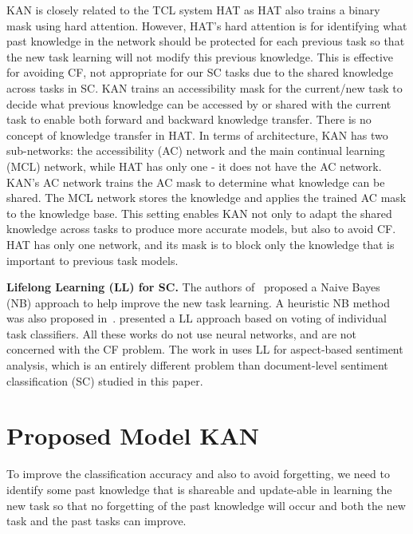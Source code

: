 \documentclass[runningheads]{llncs}
\begin{document}
{\color{black}KAN is closely related to the TCL system HAT \cite{DBLP:conf/icml/SerraSMK18} as HAT also trains a binary mask using hard attention. However, HAT's hard attention is for identifying what past knowledge in the network should be protected for each previous task so that the new task learning will not modify this previous knowledge. This is effective for avoiding CF, not appropriate for our SC tasks due to the shared knowledge across tasks in SC. KAN trains an accessibility mask for the current/new task to decide what previous knowledge can be accessed by or shared with the current task to enable both forward and backward knowledge transfer. There is no concept of knowledge transfer in HAT. In terms of architecture, KAN has two sub-networks: the accessibility (AC) network and the main continual learning (MCL) network, while HAT has only one - it does not have the AC network. KAN's AC network trains the AC mask to determine what knowledge can be shared. The MCL network stores the knowledge and applies the trained AC mask to the knowledge base. This setting enables KAN not only to adapt the shared  knowledge across tasks to produce more accurate models, but also to avoid CF. HAT has only one network, and its mask is to block only the knowledge that is important to previous task models. } 



\vspace{2mm}
\noindent
\textbf{Lifelong Learning (LL) for SC.} The authors of~\cite{DBLP:conf/acl/ChenM015,hao2019forward} proposed a Naive Bayes (NB) approach to help improve the new task learning. A heuristic NB method was also proposed in~\cite{hao2019forward}.  \cite{xia2017distantly} presented {\color{black}a} LL approach based on voting of individual task classifiers. All these works do not use neural networks, and are not concerned with the CF problem. The work in \cite{ShuXuLiu2017,shuai2018lifelong} uses LL for aspect-based sentiment analysis, which is an entirely different problem than document-level sentiment classification (SC) studied in this paper. 




\section{Proposed Model KAN}
\label{sec:model}





To improve the classification accuracy and also to avoid forgetting, we need to identify some past knowledge that is shareable and update-able in learning the new task so that no forgetting of the past knowledge will occur and both the new task and the past tasks can improve. 
\end{document}
